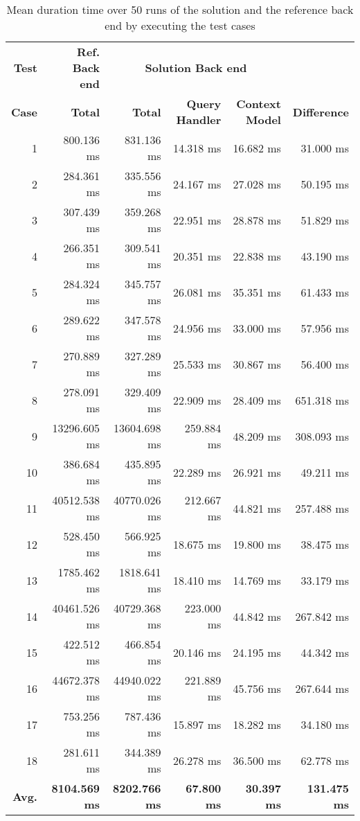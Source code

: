 \documentclass[draft,final]{vutinfth} %
\begin{document}
\begin{table}[]
	\caption{Mean duration time over 50 runs of the solution and the reference back end by executing the test cases}
	\centering
	\begin{tabular}{r|r|r|r|r|r}
		
		\textbf{Test} & \textbf{Ref. Back end} & \multicolumn{3}{c|}{\textbf{Solution Back end}} &  \\ \textbf{Case} & \textbf{Total} & \textbf{Total} & \textbf{Query Handler} & \textbf{Context Model} & \textbf{Difference} \\ \hline
		1 & 800.136 ms & 831.136 ms & 14.318 ms & 16.682 ms & 31.000 ms \\ 
		2 & 284.361 ms & 335.556 ms & 24.167 ms & 27.028 ms & 50.195 ms \\ 
		3 & 307.439 ms & 359.268 ms & 22.951 ms & 28.878 ms & 51.829 ms \\ 
		4 & 266.351 ms & 309.541 ms & 20.351 ms & 22.838 ms & 43.190 ms \\ 
		5 & 284.324 ms & 345.757 ms & 26.081 ms & 35.351 ms & 61.433 ms \\ 
		6 & 289.622 ms & 347.578 ms & 24.956 ms & 33.000 ms & 57.956 ms \\ 
		7 & 270.889 ms & 327.289 ms & 25.533 ms & 30.867 ms & 56.400 ms \\ 
		8 & 278.091 ms & 329.409 ms & 22.909 ms & 28.409 ms & 651.318 ms \\ 
		9 & 13296.605 ms & 13604.698 ms & 259.884 ms & 48.209 ms & 308.093 ms \\ 
		10 & 386.684 ms & 435.895 ms & 22.289 ms & 26.921 ms & 49.211 ms \\ 
		11 & 40512.538 ms & 40770.026 ms & 212.667 ms & 44.821 ms & 257.488 ms \\ 
		12 & 528.450 ms & 566.925 ms & 18.675 ms & 19.800 ms & 38.475 ms \\ 
		13 & 1785.462 ms & 1818.641 ms & 18.410 ms & 14.769 ms & 33.179 ms \\ 
		14 & 40461.526 ms & 40729.368 ms & 223.000 ms & 44.842 ms & 267.842 ms  \\ 
		15 & 422.512 ms & 466.854 ms & 20.146 ms & 24.195 ms & 44.342 ms \\ 
		16 & 44672.378 ms & 44940.022 ms & 221.889 ms & 45.756 ms & 267.644 ms \\ 
		17 & 753.256 ms & 787.436 ms & 15.897 ms & 18.282 ms & 34.180 ms \\ 
		18 & 281.611 ms & 344.389 ms & 26.278 ms & 36.500 ms & 62.778 ms \\ \hline
		\textbf{Avg.} & \textbf{8104.569 ms} & \textbf{8202.766 ms} & \textbf{67.800 ms} & \textbf{30.397 ms} & \textbf{131.475 ms} \\ 
	\end{tabular}
	\label{Tab:eva_performance}
\end{table}
\end{document}
